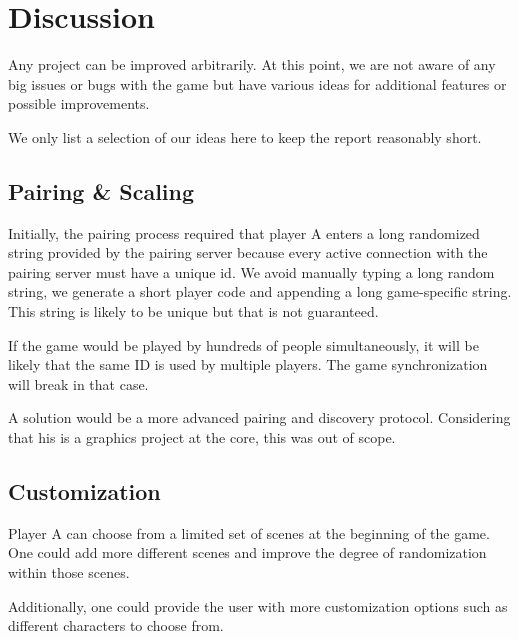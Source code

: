 \documentclass[11pt]{article}
\begin{document}

\section{Discussion}
\par Any project can be improved arbitrarily. At this point, we are not aware of any big issues or bugs with the game but have various ideas for additional features or possible improvements.
\par We only list a selection of our ideas here to keep the report reasonably short.

\subsection{Pairing \& Scaling}
\par Initially, the pairing process required that player A enters a long randomized string provided by the pairing server because every active connection with the pairing server must have a unique id. We avoid manually typing a long random string, we generate a short player code and appending a long game-specific string. This string is likely to be unique but that is not guaranteed.
\par If the game would be played by hundreds of people simultaneously, it will be likely that the same ID is used by multiple players. The game synchronization will break in that case.
\par A solution would be a more advanced pairing and discovery protocol. Considering that his is a graphics project at the core, this was out of scope.

\subsection{Customization}
\par Player A can choose from a limited set of scenes at the beginning of the game. One could add more different scenes and improve the degree of randomization within those scenes.
\par Additionally, one could provide the user with more customization options such as different characters to choose from.
\end{document}
